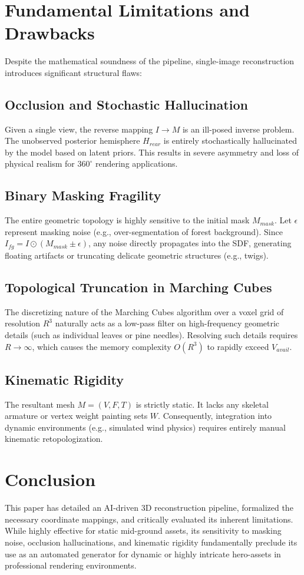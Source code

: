 \documentclass[10pt,journal,compsoc]{IEEEtran}
\begin{document}
\section{Fundamental Limitations and Drawbacks}
Despite the mathematical soundness of the pipeline, single-image reconstruction introduces significant structural flaws:

\subsection{Occlusion and Stochastic Hallucination}
Given a single view, the reverse mapping $I \to M$ is an ill-posed inverse problem. The unobserved posterior hemisphere $H_{rear}$ is entirely stochastically hallucinated by the model based on latent priors. This results in severe asymmetry and loss of physical realism for $360^{\circ}$ rendering applications.

\subsection{Binary Masking Fragility}
The entire geometric topology is highly sensitive to the initial mask $M_{mask}$. Let $\epsilon$ represent masking noise (e.g., over-segmentation of forest background). Since $I_{fg} = I \odot (M_{mask} \pm \epsilon)$, any noise directly propagates into the SDF, generating floating artifacts or truncating delicate geometric structures (e.g., twigs).

\subsection{Topological Truncation in Marching Cubes}
The discretizing nature of the Marching Cubes algorithm over a voxel grid of resolution $R^3$ naturally acts as a low-pass filter on high-frequency geometric details (such as individual leaves or pine needles). Resolving such details requires $R \to \infty$, which causes the memory complexity $O(R^3)$ to rapidly exceed $V_{avail}$.

\subsection{Kinematic Rigidity}
The resultant mesh $M = (V, F, T)$ is strictly static. It lacks any skeletal armature or vertex weight painting sets $W$. Consequently, integration into dynamic environments (e.g., simulated wind physics) requires entirely manual kinematic retopologization.

\section{Conclusion}
This paper has detailed an AI-driven 3D reconstruction pipeline, formalized the necessary coordinate mappings, and critically evaluated its inherent limitations. While highly effective for static mid-ground assets, its sensitivity to masking noise, occlusion hallucinations, and kinematic rigidity fundamentally preclude its use as an automated generator for dynamic or highly intricate hero-assets in professional rendering environments.
\end{document}
